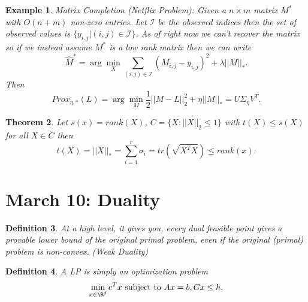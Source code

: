 \documentclass[a4paper]{article}
\newtheorem{thm}{Theorem}[section]
\newtheorem{defn}[thm]{Definition}
\newtheorem{eg}[thm]{Example}
\begin{document}
\begin{eg}
    Matrix Completion (Netflix Problem): Given a $n\times m$ matrix $M^*$ with $O(n+m)$ non-zero entries. Let $\mathcal{I}$ be the observed indices then the set of observed values is $\{y_{i,j}| (i,j)\in \mathcal{I}\}$. As of right now we can't recover the matrix so if we instead assume $M^*$ is a low rank matrix then we can write 
    \[
    \hat{M}^*=\arg\min_{X}\sum_{(i,j)\in \mathcal{I}}(M_{i,j}-y_{i,j})^2+\lambda ||M||_*
    .\]
    Then
    \[
    Prox_{\eta, *}(L)=\arg\min_M \frac{1}{2}||M-L||_2^2+\eta||M||_*=U\Sigma_\eta V^T \tag{where$L=U\Sigma V^T$}
    .\]  
\end{eg}
\begin{thm}
    Let $s(x)=rank(X)$, $C= \{X: ||X||_2\leq 1\}$ with $t(X)\leq s(X)$ for all $X\in C$ then 
    \[
        t(X)=||X||_*=\sum_{i=1}^r \sigma_i=tr(\sqrt{X^TX})\leq rank(x)
    .\] 
\end{thm}
\newpage
\section{March 10: Duality}
\begin{defn}
    At a high level, it gives you, every dual feasible point gives a provable lower bound of the original primal problem, even if the original (primal) problem is non-convex. (Weak Duality) 
\end{defn}
\begin{defn}
    A LP is simply an optimization problem \[
    \min_{x\in \R^d} c^T x \text{ subject to } Ax=b, Gx\leq h
    .\] 
\end{defn}
\end{document}
